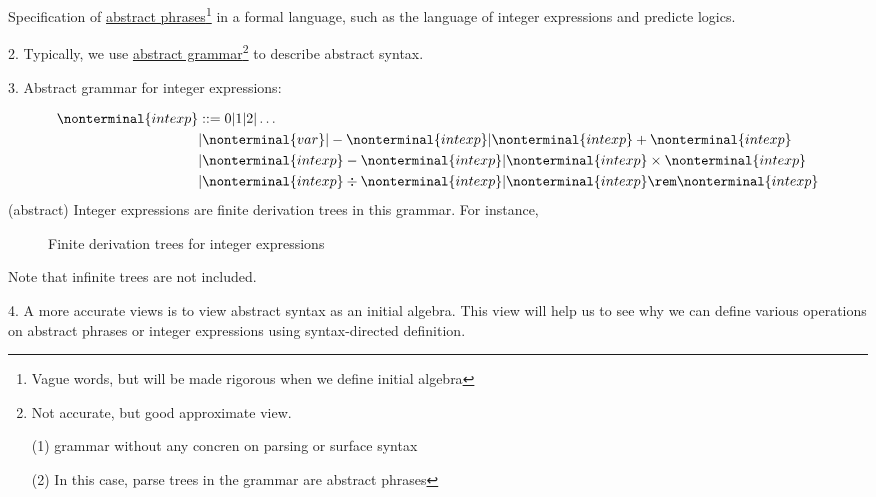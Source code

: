 \documentclass{report}[12pt]
\begin{document}
Specification of \underline{abstract phrases}\footnote{Vague words, but will be made rigorous when we define initial algebra} in a formal language, such as the language of integer expressions and predicte logics.

2. Typically, we use \underline{abstract grammar}\footnote{Not accurate, but good approximate view.

(1) grammar without any concren on parsing or surface syntax

(2) In this case, parse trees in the grammar are abstract phrases} to describe abstract syntax.

3. Abstract grammar for integer expressions:

\begin{align*}
    \nonterminal{intexp}&::=0 | 1 | 2 | \ldots \\
    &| \nonterminal{var} | -\nonterminal{intexp} | \nonterminal{intexp} + \nonterminal{intexp} \\
    &| \nonterminal{intexp} - \nonterminal{intexp} | \nonterminal{intexp} \times \nonterminal{intexp} \\
    &| \nonterminal{intexp} \div \nonterminal{intexp} | \nonterminal{intexp} \rem \nonterminal{intexp}
\end{align*}
(abstract) Integer expressions are finite derivation trees in this grammar. For instance,

\begin{figure}
    \caption{Finite derivation trees for integer expressions}
\end{figure}
Note that infinite trees are not included.

4. A more accurate views is to view abstract syntax as an initial algebra. This view will help us to see why we can define various operations on abstract phrases or integer expressions using syntax-directed definition.
\end{document}
